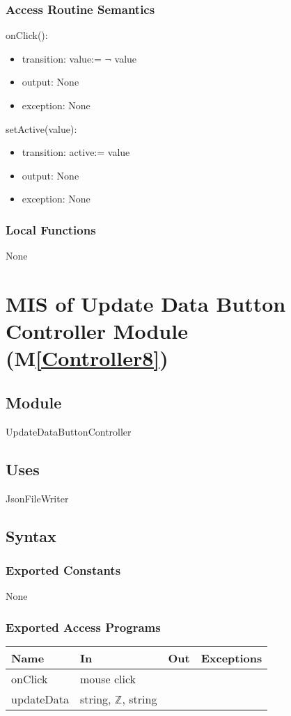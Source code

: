 \documentclass[12pt, titlepage]{article}
\newcommand{\mref}[1]{M\ref{#1}}
\begin{document}
\subsubsection{Access Routine Semantics}

\noindent onClick():
\begin{itemize}
\item transition: value:= $\neg$ value
\item output: None
\item exception: None
\end{itemize}

\noindent setActive(value):
\begin{itemize}
\item transition: active:= value
\item output: None
\item exception: None
\end{itemize}

\subsubsection{Local Functions}

None

\newpage

  \section{MIS of Update Data Button Controller Module (\mref{Controller8})}
\subsection{Module}

UpdateDataButtonController

\subsection{Uses}
JsonFileWriter
\subsection{Syntax}
\subsubsection{Exported Constants}
None
\subsubsection{Exported Access Programs}
\begin{center}
\begin{tabular}{|l|l|l|p{5cm}|}
\hline
\textbf{Name} & \textbf{In} & \textbf{Out} & \textbf{Exceptions} \\
\hline
onClick & mouse click & & \\
\hline
updateData &  string, $\mathbb{Z}$, string &  &  \\
\hline
\end{tabular}
\end{center}
\end{document}
